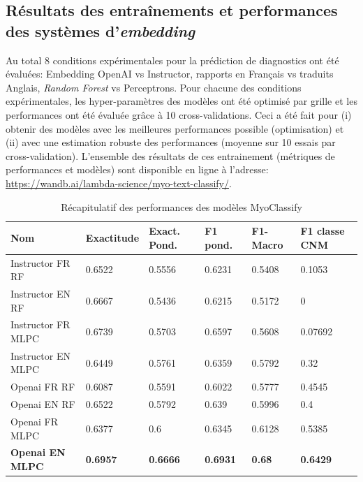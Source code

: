 \subsection{Résultats des entraînements et performances des systèmes d'\textit{embedding}}
Au total 8 conditions expérimentales pour la prédiction de diagnostics ont été évaluées: Embedding OpenAI vs Instructor, rapports en Français vs traduits Anglais, \textit{Random Forest} vs Perceptrons. Pour chacune des conditions expérimentales, les hyper-paramètres des modèles ont été optimisé par grille et les performances ont été évaluée grâce à 10 cross-validations. Ceci a été fait pour (i) obtenir des modèles avec les meilleures performances possible (optimisation) et (ii) avec une estimation robuste des performances (moyenne sur 10 essais par cross-validation). L'ensemble des résultats de ces entrainement (métriques de performances et modèles) sont disponible en ligne à l'adresse: \href{https://wandb.ai/lambda-science/myo-text-classify/}{https://wandb.ai/lambda-science/myo-text-classify/}. 
\begin{table}[ht]
\centering
\caption{Récapitulatif des performances des modèles MyoClassify}
\label{tab:myoclassify_metrics}
\begin{tabularx}{\textwidth}{|X|X|X|X|X|X|}
\toprule
\textbf{Nom} & \textbf{Exactitude} & \textbf{Exact. Pond.} & \textbf{F1 pond.} & \textbf{F1-Macro} & \textbf{F1 classe CNM} \\\hline
Instructor FR RF & 0.6522 & 0.5556 & 0.6231 & 0.5408 & 0.1053 \\ \hline
Instructor EN RF & 0.6667 & 0.5436 & 0.6215 & 0.5172 & 0 \\ \hline
Instructor FR MLPC & 0.6739 & 0.5703 & 0.6597 & 0.5608 & 0.07692 \\ \hline
Instructor EN MLPC & 0.6449 & 0.5761 & 0.6359 & 0.5792 & 0.32 \\ \hline
Openai FR RF & 0.6087 & 0.5591 & 0.6022 & 0.5777 & 0.4545 \\ \hline
Openai EN RF & 0.6522 & 0.5792 & 0.639 & 0.5996 & 0.4 \\ \hline
Openai FR MLPC & 0.6377 & 0.6 & 0.6345 & 0.6128 & 0.5385 \\ \hline
\textbf{Openai EN MLPC} & \textbf{0.6957} &\textbf{0.6666}& \textbf{0.6931} &\textbf{ 0.68} & \textbf{0.6429} \\ \hline
\end{tabularx}
\end{table}
